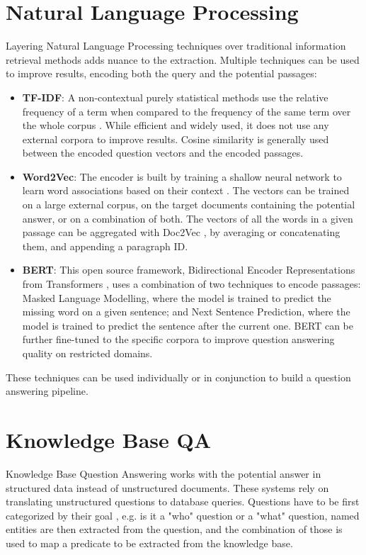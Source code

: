\section{Natural Language Processing}
Layering Natural Language Processing techniques over traditional information retrieval methods adds nuance to the extraction. Multiple techniques can be used to improve results, encoding both the query and the potential passages:

\begin{itemize}
	\item \textbf{TF-IDF}: A non-contextual purely statistical methods use the relative frequency of a term when compared to the frequency of the same term over the whole corpus \cite{5392697}. While efficient and widely used, it does not use any external corpora to improve results. Cosine similarity is generally used between the encoded question vectors and the encoded passages.
	\item \textbf{Word2Vec}: The encoder is built by training a shallow neural network to learn word associations based on their context \cite{mikolov2013efficient}. The vectors can be trained on a large external corpus, on the target documents containing the potential answer, or on a combination of both. The vectors of all the words in a given passage can be aggregated with Doc2Vec \cite{le2014distributed}, by averaging or concatenating them, and appending a paragraph ID.
	\item \textbf{BERT}: This open source framework, Bidirectional Encoder Representations from Transformers \cite{devlin2018bert}, uses a combination of two techniques to encode passages: Masked Language Modelling, where the model is trained to predict the missing word on a given sentence; and Next Sentence Prediction, where the model is trained to predict the sentence after the current one. BERT can be further fine-tuned to the specific corpora to improve question answering quality on restricted domains.
\end{itemize}

These techniques can be used individually or in conjunction to build a question answering pipeline.

\section{Knowledge Base QA}
Knowledge Base Question Answering works with the potential answer in structured data instead of unstructured documents. These systems rely on translating unstructured questions to database queries. Questions have to be first categorized by their goal \cite{YANG20159086}, e.g. is it a "who" question or a "what" question, named entities are then extracted from the question, and the combination of those is used to map a predicate to be extracted from the knowledge base.

